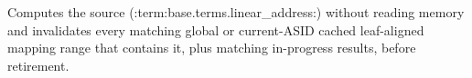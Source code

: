 Computes the source (:term:base.terms.linear_address:) without reading memory and invalidates every matching global or current-ASID cached leaf-aligned mapping range that contains it, plus matching in-progress results, before retirement.
